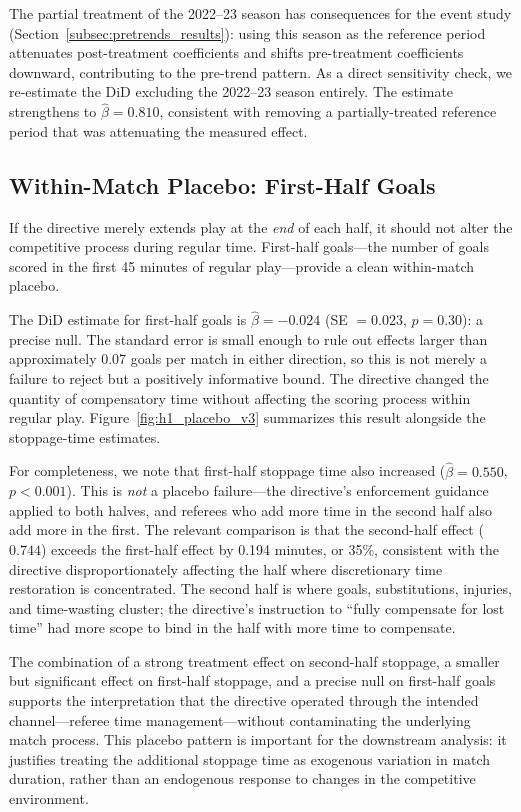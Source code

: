 The partial treatment of the 2022--23 season has consequences for the event study (Section~\ref{subsec:pretrends_results}): using this season as the reference period attenuates post-treatment coefficients and shifts pre-treatment coefficients downward, contributing to the pre-trend pattern. As a direct sensitivity check, we re-estimate the DiD excluding the 2022--23 season entirely. The estimate strengthens to $\hat{\beta} = 0.810$, consistent with removing a partially-treated reference period that was attenuating the measured effect.


\subsection{Within-Match Placebo: First-Half Goals}
\label{subsec:placebo}

If the directive merely extends play at the \textit{end} of each half, it should not alter the competitive process during regular time. First-half goals---the number of goals scored in the first 45 minutes of regular play---provide a clean within-match placebo.

The DiD estimate for first-half goals is $\hat{\beta} = -0.024$ (SE $= 0.023$, $p = 0.30$): a precise null. The standard error is small enough to rule out effects larger than approximately 0.07 goals per match in either direction, so this is not merely a failure to reject but a positively informative bound. The directive changed the quantity of compensatory time without affecting the scoring process within regular play. Figure~\ref{fig:h1_placebo_v3} summarizes this result alongside the stoppage-time estimates.

For completeness, we note that first-half stoppage time also increased ($\hat{\beta} = 0.550$, $p < 0.001$). This is \textit{not} a placebo failure---the directive's enforcement guidance applied to both halves, and referees who add more time in the second half also add more in the first. The relevant comparison is that the second-half effect ($0.744$) exceeds the first-half effect by 0.194 minutes, or 35\%, consistent with the directive disproportionately affecting the half where discretionary time restoration is concentrated. The second half is where goals, substitutions, injuries, and time-wasting cluster; the directive's instruction to ``fully compensate for lost time'' had more scope to bind in the half with more time to compensate.

The combination of a strong treatment effect on second-half stoppage, a smaller but significant effect on first-half stoppage, and a precise null on first-half goals supports the interpretation that the directive operated through the intended channel---referee time management---without contaminating the underlying match process. This placebo pattern is important for the downstream analysis: it justifies treating the additional stoppage time as exogenous variation in match duration, rather than an endogenous response to changes in the competitive environment.

